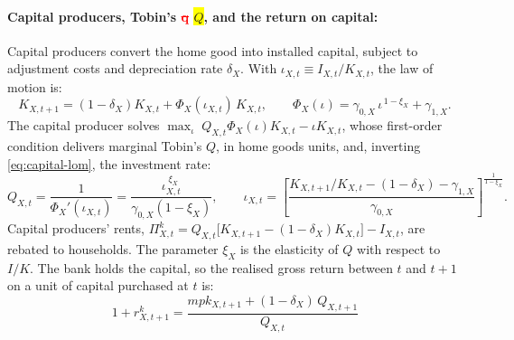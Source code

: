 \paragraph{Capital producers, Tobin's \textcolor{red}{\st{q}} \colorbox{yellow}{$Q$}, and the return on capital:}
Capital producers convert the home good into installed capital, subject to adjustment costs \cite{jermann1998asset} and depreciation rate $\delta_X$. With $\iota_{X,t}\equiv I_{X,t}/K_{X,t}$, the law of motion is:
\begin{equation}
K_{X,t+1}=(1-\delta_X)K_{X,t}+\Phi_X(\iota_{X,t})\,K_{X,t},
\qquad
\Phi_X(\iota)=\gamma_{0,X}\,\iota^{\,1-\xi_X}+\gamma_{1,X}.
\label{eq:capital-lom}
\end{equation}
The capital producer solves $\max_{\iota}\;Q_{X,t}\Phi_X(\iota)K_{X,t}-\iota K_{X,t}$, whose first-order condition delivers marginal Tobin's $Q$, in home goods units, and, inverting
\eqref{eq:capital-lom}, the investment rate:
\begin{equation}
Q_{X,t}=\frac{1}{\Phi_X'(\iota_{X,t})}
      =\frac{\iota_{X,t}^{\;\xi_X}}{\gamma_{0,X}(1-\xi_X)},
\qquad
\iota_{X,t}=\left[\frac{K_{X,t+1}/K_{X,t}-(1-\delta_X)-\gamma_{1,X}}
                       {\gamma_{0,X}}\right]^{\frac{1}{1-\xi_X}} .
\label{eq:tobins-q}
\end{equation}
Capital producers' rents, $\Pi^{k}_{X,t}=Q_{X,t}\bigl[K_{X,t+1}-(1-\delta_X)K_{X,t}\bigr]-I_{X,t}$, are rebated to households. The parameter $\xi_X$ is the elasticity of $Q$ with respect to $I/K$. The bank holds the capital, so the realised gross return between $t$ and $t+1$ on a unit of capital purchased at $t$ is:
\begin{equation}
\;1+r^{k}_{X,t+1}=\frac{mpk_{X,t+1}+(1-\delta_X)\,Q_{X,t+1}}{Q_{X,t}}\
\label{eq:rk}
\end{equation}
